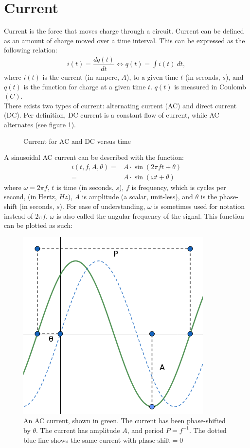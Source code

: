 \section{Current}
Current is the force that moves charge through a circuit. Current can be defined as an amount of charge moved over a time interval. This can be expressed as the following relation:
\begin{align}
i(t)=\dfrac{dq(t)}{dt} \Leftrightarrow q(t)=\int i(t)\ dt,
\label{I=dq/dt}
\end{align}
where $i(t)$ is the current (in ampere, $A$), to a given time $t$ (in seconds, $s$), and $q(t)$ is the function for charge at a given time $t$. $q(t)$ is measured in Coulomb $(C)$.
\\
There exists two types of current: alternating current (AC) and direct current (DC). Per definition, DC current is a constant flow of current, while AC alternates (see figure \ref{fig:ACDC}). 
\begin{figure}[H] 

\caption{Current for AC and DC versus time}
\label{fig:ACDC}
\end{figure}
\noindent
A sinusoidal AC current can be described with the function: 
\begin{align}
i(t, f, A, \theta) =& A\cdot \sin{(2\pi ft + \theta)} \nonumber
\\
=& A \cdot \sin{(\omega t + \theta)} \label{eq:omega}
\end{align}
where $\omega = 2\pi f$, $t$ is time (in seconds, $s$), $f$ is frequency, which is cycles per second, (in Hertz, $Hz$), $A$ is amplitude (a scalar, unit-less), and $\theta$ is the phase-shift (in seconds, $s$).
For ease of understanding, $\omega$ is sometimes used for notation instead of $2\pi f$. $\omega$ is also called the angular frequency of the signal.
This function can be plotted as such:
\begin{figure}[H]
	\centering
	\includegraphics[scale=0.7]{fig/img/AC.png}
	\caption{An AC current, shown in green. The current has been phase-shifted by $\theta$. The current has amplitude $A$, and period $P=f^{-1}$. The dotted blue line shows the same current with $\text{phase-shift} =0$}
\end{figure}


